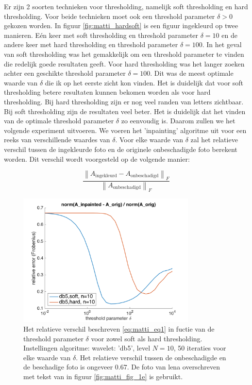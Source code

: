 \FloatBarrier


Er zijn 2 soorten technieken voor thresholding, namelijk soft thresholding en hard thresholding. Voor beide technieken moet ook een threshold parameter $\delta > 0$ gekozen worden. In figuur \ref{fig:matti_hardsoft} is een figuur ingekleurd op twee manieren. E\'{e}n keer met soft thresholding en threshold parameter $\delta = 10$ en de andere keer met hard thresholding en threshold parameter $\delta = 100$. In het geval van soft thresholding was het gemakkelijk om een threshold parameter te vinden die redelijk goede resultaten geeft. Voor hard thresholding was het langer zoeken achter een geschikte threshold parameter $\delta = 100$. Dit was de meest optimale waarde van $\delta$ die ik op het eerste zicht kon vinden. Het is duidelijk dat voor soft thresholding betere resultaten kunnen bekomen worden als voor hard thresholding. Bij hard thresholding zijn er nog veel randen van letters zichtbaar. Bij soft thresholding zijn de resultaten veel beter. 
\newline
\newline
Het is duidelijk dat het vinden van de optimale threshold parameter $\delta$ zo eenvoudig is. Daarom zullen we het volgende experiment uitvoeren. We voeren het 'inpainting' algoritme uit voor een reeks van verschillende waardes van $\delta$. Voor elke waarde van $\delta$ zal het relatieve verschil tussen de ingekleurde foto en de originele onbeschadigde foto berekent worden. Dit verschil wordt voorgesteld op de volgende manier:

\begin{equation} \label{eq:matti_eq1}
\frac{\left\lVert A_{\text{ingekleurd}} - A_{\text{onbeschadigd}} \right\rVert_{F}}{\left\lVert A_{\text{onbeschadigd}} \right\rVert_{F}}
\end{equation}

\begin{figure}
  \centering
    \includegraphics[width=0.8\textwidth]{../src/inpainting/error_plot_3}
    \caption{Het relatieve verschil beschreven \eqref{eq:matti_eq1} in fuctie van de threshold parameter $\delta$ voor zowel soft als hard thresholding. Instellingen algoritme: wavelet: 'db5', level $N = 10$, 50 iteraties voor elke waarde van $\delta$. Het relatieve verschil tussen de onbeschadigde en de beschadige foto is ongeveer $0.67$. De foto van lena overschreven met tekst van in figuur \ref{fig:matti_fig_1e} is gebruikt.}
    \label{fig:matti_error_plot_3}
\end{figure}

